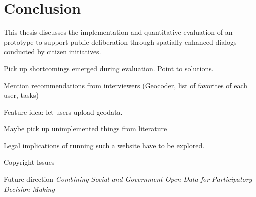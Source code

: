 \section{Conclusion}
\label{chap:conclusion}
This thesis discusses the implementation and quantitative evaluation of an prototype to support public deliberation through spatially enhanced dialogs conducted by citizen initiatives. 


Pick up shortcomings emerged during evaluation. Point to solutions. 

Mention recommendations from interviewers (Geocoder, list of favorites of each user, tasks)

Feature idea: let users upload geodata.

Maybe pick up unimplemented things from literature

Legal implications of running such a website have to be explored.

Copyright Issues \cite{Carver2001_PPGIS_Cyberdemocracy}


Future direction \textit{Combining Social and Government Open Data for Participatory Decision-Making}